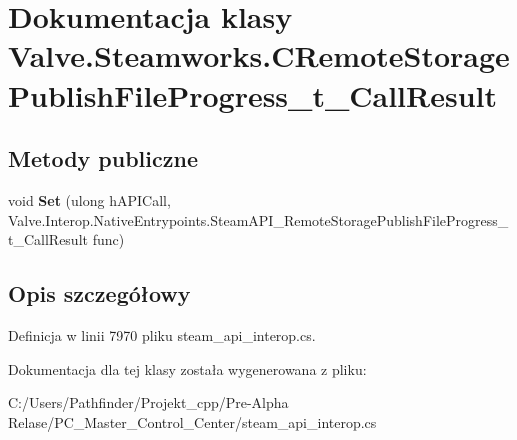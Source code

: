 \hypertarget{class_valve_1_1_steamworks_1_1_c_remote_storage_publish_file_progress__t___call_result}{}\section{Dokumentacja klasy Valve.\+Steamworks.\+C\+Remote\+Storage\+Publish\+File\+Progress\+\_\+t\+\_\+\+Call\+Result}
\label{class_valve_1_1_steamworks_1_1_c_remote_storage_publish_file_progress__t___call_result}
\subsection*{Metody publiczne}
\begin{DoxyCompactItemize}
\item 
\mbox{\label{class_valve_1_1_steamworks_1_1_c_remote_storage_publish_file_progress__t___call_result_a51d2b81ef766d30c15d7b5078867498e}} 
void {\bfseries Set} (ulong h\+A\+P\+I\+Call, Valve.\+Interop.\+Native\+Entrypoints.\+Steam\+A\+P\+I\+\_\+\+Remote\+Storage\+Publish\+File\+Progress\+\_\+t\+\_\+\+Call\+Result func)
\end{DoxyCompactItemize}


\subsection{Opis szczegółowy}


Definicja w linii 7970 pliku steam\+\_\+api\+\_\+interop.\+cs.



Dokumentacja dla tej klasy została wygenerowana z pliku\+:\begin{DoxyCompactItemize}
\item 
C\+:/\+Users/\+Pathfinder/\+Projekt\+\_\+cpp/\+Pre-\/\+Alpha Relase/\+P\+C\+\_\+\+Master\+\_\+\+Control\+\_\+\+Center/steam\+\_\+api\+\_\+interop.\+cs\end{DoxyCompactItemize}
